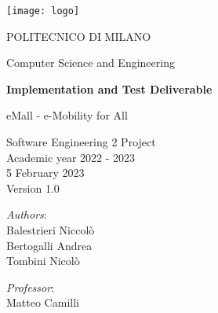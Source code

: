 \begin{titlingpage}
	\begin{center}
		\texttt{[image: logo]}
		
		\vspace{0.25cm}
		
		\LARGE POLITECNICO DI MILANO\\
		
		\vspace{0.2cm}
		
		\Large Computer Science and Engineering
		
		\vspace{0.8cm}
	
		\Huge \textbf{Implementation and Test Deliverable}
		
		\vspace{0.5cm}
		\huge eMall - e-Mobility for All
		
		\vspace{1.5cm}
		\LARGE Software Engineering 2 Project\\
		\Large Academic year 2022 - 2023\\
		\vspace{1cm}
		5 February 2023\\Version 1.0
		\vspace{2.5cm}
		
		\large
		\begin{minipage}{.1\textwidth}
			\null
		\end{minipage}%
		\begin{minipage}{.4\textwidth}
			\textit{Authors}:\\
			Balestrieri Niccolò\\
			Bertogalli Andrea\\
			Tombini Nicolò
		\end{minipage}%
		\begin{minipage}{.4\textwidth}
			\raggedleft	
			\textit{Professor}:\\
			Matteo Camilli\\
			\phantom{placeholder}
		\end{minipage}%
		\begin{minipage}{.1\textwidth}
			\null
		\end{minipage}
	
			
		\end{center}
\end{titlingpage}